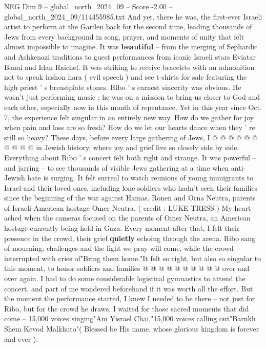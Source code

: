 \begin{textsample}{NEG Dim 9 – global\_north\_2024\_09 – Score -2.00 – global\_north\_2024\_09/114455985.txt}  \label{ex:f9_neg_212}
And yet, there he was, the first-ever Israeli artist to perform at the Garden back for the second time, leading thousands of Jews from every background in song, prayer, and moments of unity that felt almost impossible to imagine.
It was \textbf{beautiful} -- from the merging of Sephardic and Ashkenazi traditions to guest performances from iconic Israeli stars Eviatar Banai and Idan Raichel.
It was striking to receive bracelets with an admonition not to speak lashon hara ( evil speech ) and see t-shirts for sale featuring the high priest ' s breastplate stones.
Ribo ' s earnest sincerity was obvious.
He wasn't just performing music ; he was on a mission to bring us closer to God and each other, especially now in this month of repentance.
Yet in this year since Oct. 7, the experience felt singular in an entirely new way.
How do we gather for joy when pain and loss are so fresh?
How do we let our hearts dance when they ' re still so heavy?
These days, before every large gathering of Jews, I @ @ @ @ @ @ @ @ @ @ in Jewish history, where joy and grief live so closely side by side.
Everything about Ribo ' s concert felt both right and strange.
It was powerful -- and jarring -- to see thousands of visible Jews gathering at a time when anti-Jewish hate is surging.
It felt surreal to watch reunions of young immigrants to Israel and their loved ones, including lone soldiers who hadn't seen their families since the beginning of the war against Hamas.
Ronen and Orna Neutra, parents of Israeli-American hostage Omer Neutra. ( credit : LUKE TRESS ) My heart ached when the cameras focused on the parents of Omer Neutra, an American hostage currently being held in Gaza.
Every moment after that, I felt their presence in the crowd, their grief \textbf{quietly} echoing through the arena.
Ribo sang of mourning, challenges and the light we pray will come, while the crowd interrupted with cries of"Bring them home."It felt so right, but also so singular to this moment, to honor soldiers and families @ @ @ @ @ @ @ @ @ @ over and over again.
I had to do some considerable logistical gymnastics to attend the concert, and part of me wondered beforehand if it was worth all the effort.
But the moment the performance started, I knew I needed to be there -- not just for Ribo, but for the crowd he draws.
I waited for those sacred moments that did come -- 15,000 voices singing"Am Yisrael Chai,"15,000 voices calling out"Barukh Shem Kevod Malkhuto"( Blessed be His name, whose glorious kingdom is forever and ever ).

\end{textsample}
